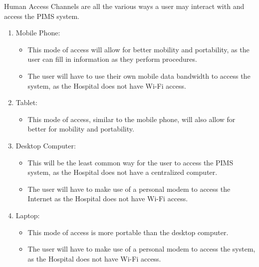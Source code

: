 Human Access Channels are all the various ways a user may interact with and access the PIMS system.

\begin{enumerate}
	\item Mobile Phone:
	\begin{itemize}
		\item This mode of access will allow for better mobility and portability, as the user can fill in information as they perform procedures.
		\item The user will have to use their own mobile data bandwidth to access the system, as the Hospital does not have Wi-Fi access.
	\end{itemize}
	\item Tablet:
	\begin{itemize}
		\item This mode of access, similar to the mobile phone, will also allow for better for mobility and portability.
	\end{itemize}
	
	\item Desktop Computer:
	\begin{itemize}
		\item This will be the least common way for the user to access the PIMS system, as the Hospital does not have a centralized computer.
		\item The user will have to make use of a personal modem to access the Internet as the Hospital does not have Wi-Fi access.
	\end{itemize}
	\item Laptop:
	\begin{itemize}
		\item This mode of access is more portable than the desktop computer.
		\item The user will have to make use of a personal modem to access the system, as the Hospital does not have Wi-Fi access.
	\end{itemize}

\end{enumerate} 